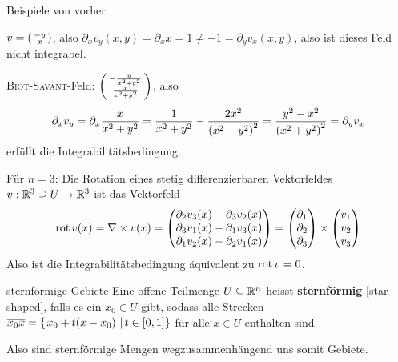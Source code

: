 \begin{example}Beispiele von vorher:

$v = \left(\begin{smallmatrix} -y\\x \end{smallmatrix}\right)$, also $\partial_xv_y(x,y) = \partial_xx=1 \ne -1 = \partial_yv_x(x,y)$, also ist dieses Feld nicht integrabel.

\textsc{Biot-Savant}-Feld: $\left(\begin{smallmatrix} -\frac{y}{x^2+y^2}\\\frac{x}{x^2+y^2} \end{smallmatrix}\right)$, also
$$\partial_xv_y = \partial_x \frac{x}{x^2+y^2} = \frac{1}{x^2+y^2}-\frac{2x^2}{\left(x^2+y^2\right)^2}=\frac{y^2-x^2}{\left(x^2+y^2\right)^2}=\partial_yv_x$$
erfüllt die Integrabilitätsbedingung.
\end{example}
\begin{remark}[Rotation]
Für $n=3$: Die Rotation eines stetig differenzierbaren Vektorfeldes $v:\mathbb{R}^3\supseteq U \to \mathbb{R}^3$ ist das Vektorfeld
$$\operatorname{rot} v (x) = \nabla \times v(x) = \begin{pmatrix}\partial_2v_3(x)-\partial_3v_2(x)\\\partial_3v_1(x)-\partial_1v_3(x)\\\partial_1v_2(x)-\partial_2v_1(x)\end{pmatrix} = \begin{pmatrix}\partial_1\\\partial_2\\\partial_3\end{pmatrix}\times\begin{pmatrix}v_1\\v_2\\v_3\end{pmatrix}$$
Also ist die Integrabilitätsbedingung äquivalent zu $\operatorname{rot} v = 0$.
\end{remark}

\begin{definition}{sternförmige Gebiete}{}
Eine offene Teilmenge $U \subseteq \mathbb{R}^n$ heisst \textbf{sternförmig} [star-shaped], falls es ein $x_0 \in U$ gibt, sodass alle Strecken $\overline{x_0x} = \left\{\left.x_0+t(x-x_0) \ \right| t\in [0,1] \right\}$ für alle $x\in U$ enthalten sind.
\end{definition}
Also sind sternförmige Mengen wegzusammenhängend uns somit Gebiete.

